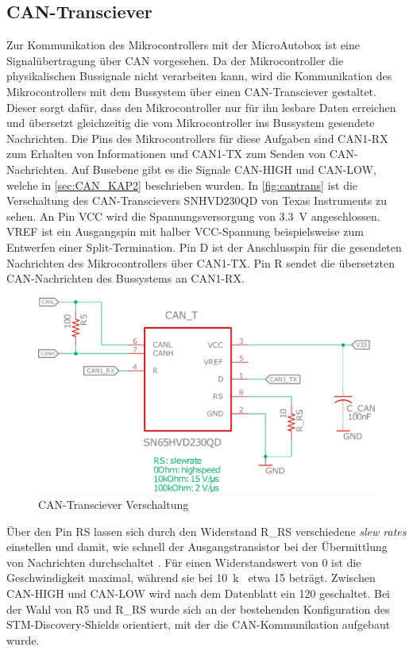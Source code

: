 \subsection{CAN-Transciever}
Zur Kommunikation des Mikrocontrollers mit der MicroAutobox ist eine Signalübertragung über CAN vorgesehen. Da der Mikrocontroller die physikalischen Bussignale nicht verarbeiten kann, wird die Kommunikation des Mikrocontrollers mit dem Bussystem über einen CAN-Transciever gestaltet. Dieser sorgt dafür, dass den Mikrocontroller nur für ihn lesbare Daten erreichen und übersetzt gleichzeitig die vom Mikrocontroller ins Bussystem gesendete Nachrichten. Die Pins des Mikrocontrollers für diese Aufgaben sind CAN1-RX zum Erhalten von Informationen und CAN1-TX zum Senden von CAN-Nachrichten. Auf Busebene gibt es die Signale CAN-HIGH und CAN-LOW, welche in \autoref{sec:CAN_KAP2} beschrieben wurden. In \autoref{fig:cantrans} ist die Verschaltung des CAN-Transcievers SNHVD230QD von Texas Instruments zu sehen. An Pin VCC wird die Spannungsversorgung von \SI{3,3}{V} angeschlossen. VREF ist ein Ausgangspin mit halber VCC-Spannung beispielsweise zum Entwerfen einer Split-Termination. Pin D ist der Anschlusspin für die gesendeten Nachrichten des Mikrocontrollers über CAN1-TX. Pin R sendet die übersetzten CAN-Nachrichten des Bussystems an CAN1-RX.
\begin{figure}[H]%
\centering
\includegraphics[width=400pt]{./Bilder/can.pdf}%
\caption{CAN-Transciever Verschaltung}%
\label{fig:cantrans}%
\end{figure}\noindent
Über den Pin RS lassen sich durch den Widerstand R\_RS verschiedene \textit{slew rates} einstellen und damit, wie schnell der Ausgangstransistor bei der Übermittlung von Nachrichten durchschaltet \cite[2]{cantrans}. Für einen Widerstandswert von \SI{0}{\Omega} ist die Geschwindigkeit maximal, während sie bei \SI{10}{k\Omega} etwa \SI{15}{} beträgt. Zwischen CAN-HIGH und CAN-LOW wird nach dem Datenblatt ein \SI{120}{\Omega} geschaltet. Bei der Wahl von R5 und R\_RS wurde sich an der bestehenden Konfiguration des STM-Discovery-Shields orientiert, mit der die CAN-Kommunikation aufgebaut wurde. 

